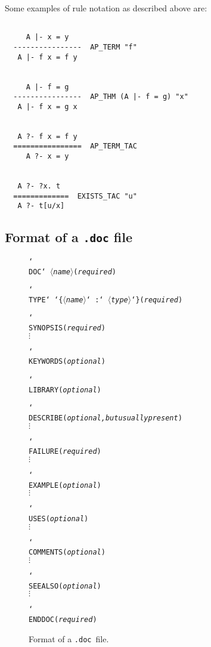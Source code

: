 \documentclass[12pt]{article}
\def\doc{{\tt .doc}}
\def\vsp{{\tt\char`\ }}
\def\bk{{\tt\char`\\ }}
\def\lb{{\tt\char`\{}}
\def\rb{{\tt\char`\}}}
\def\meta#1{\(\langle\){\it #1}\(\rangle\)}
\begin{document}
Some examples of rule notation as described above are:

\begin{verbatim}

     A |- x = y
  ----------------  AP_TERM "f"
   A |- f x = f y


     A |- f = g
  ----------------  AP_THM (A |- f = g) "x"
   A |- f x = g x


   A ?- f x = f y
  ================  AP_TERM_TAC
     A ?- x = y


   A ?- ?x. t
  =============  EXISTS_TAC "u"
   A ?- t[u/x]

\end{verbatim}

\newpage

\subsection{Format of a {\tt .doc} file}

\begin{figure}[h]
\begin{holboxed}\begin{alltt}
\bk{DOC}\vsp\meta{name}                            ({\it required} )

\bk{TYPE}\vsp\lb\meta{name}\vsp:\vsp\meta{type}\rb                 ({\it required} )

\bk{SYNOPSIS}                              ({\it required} )
\(\vdots\)

\bk{KEYWORDS}                              ({\it optional})

\bk{LIBRARY}                               ({\it optional})

\bk{DESCRIBE}                              ({\it optional, but usually present} )
\(\vdots \)

\bk{FAILURE}                               ({\it required} )
\(\vdots \)

\bk{EXAMPLE}                               ({\it optional} )
\(\vdots \)

\bk{USES}                                  ({\it optional} )
\(\vdots \)

\bk{COMMENTS}                              ({\it optional} )
\(\vdots \)

\bk{SEEALSO}                               ({\it optional} )
\(\vdots \)

\bk{ENDDOC}                                ({\it required} )
\end{alltt}\end{holboxed}
\caption{Format of a \doc\ file.\label{doc-fig}}
\end{figure}
\end{document}
